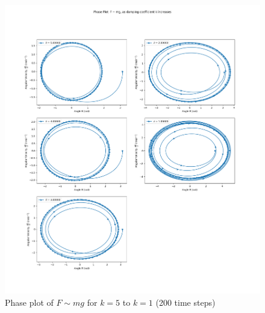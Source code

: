 \documentclass[10pt, twocolumn]{article}
\begin{document}
\begin{figure}[H]
    \centering
    \includegraphics[width = \columnwidth]{Projects/ForcedSimplePendulum/Plots/Phase plot of F~mg as damping coefficient k increases from 5 to 1 (med).png}
    \caption{Phase plot of $F \sim{mg}$ for $k = 5$ to $k = 1$ (200 time steps)}
    \label{Phase plot of k 5 to 1 med}
\end{figure}
\end{document}
